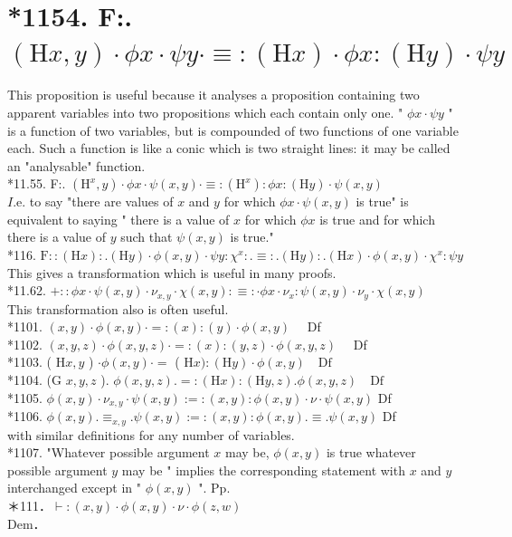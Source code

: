 \documentclass[10pt]{article}
\begin{document}
\section*{*1154. F:. $(\mathrm{H} x, y) \cdot \phi x \cdot \psi y \cdot \equiv:(\mathrm{H} x) \cdot \phi x:(\mathrm{H} y) \cdot \psi y$}
This proposition is useful because it analyses a proposition containing two apparent variables into two propositions which each contain only one. " $\phi x \cdot \psi y$ " is a function of two variables, but is compounded of two functions of one variable each. Such a function is like a conic which is two straight lines: it may be called an "analysable" function.\\
*11.55. F:. $\left(\mathrm{H}^{x}, y\right) \cdot \phi x \cdot \psi(x, y) \cdot \equiv:\left(\mathrm{H}^{x}\right): \phi x:(\mathrm{H} y) \cdot \psi(x, y)$\\
$I$.e. to say "there are values of $x$ and $y$ for which $\phi x \cdot \psi(x, y)$ is true" is equivalent to saying " there is a value of $x$ for which $\phi x$ is true and for which there is a value of $y$ such that $\psi(x, y)$ is true."\\
*116. $\mathrm{F}::(\mathrm{H} x): .(\mathrm{H} y) \cdot \phi(x, y) \cdot \psi y: \chi^{x}: . \equiv: .(\mathrm{H} y): .(\mathrm{H} x) \cdot \phi(x, y) \cdot \chi^{x}: \psi y$\\
This gives a transformation which is useful in many proofs.\\
*11.62. $+:: \phi x \cdot \psi(x, y) \cdot \nu_{x, y} \cdot \chi(x, y): \equiv: \cdot \phi x \cdot \nu_{x}: \psi(x, y) \cdot \nu_{y} \cdot \chi(x, y)$\\
This transformation also is often useful.\\
*1101. $(x, y) \cdot \phi(x, y) \cdot=:(x):(y) \cdot \phi(x, y) \quad$ Df\\
*1102. $(x, y, z) \cdot \phi(x, y, z) \cdot=:(x):(y, z) \cdot \phi(x, y, z) \quad$ Df\\
*1103. ( $\mathrm{H} x, y$ ) $\cdot \phi(x, y) \cdot=$ ( $\mathrm{H} x):(\mathrm{H} y) \cdot \phi(x, y) \quad \mathrm{Df}$\\
*1104. (G $x, y, z$ ). $\phi(x, y, z) .=:(\mathrm{H} x):(\mathrm{H} y, z) . \phi(x, y, z) \quad \mathrm{Df}$\\
*1105. $\phi(x, y) \cdot \nu_{x, y} \cdot \psi(x, y):=:(x, y): \phi(x, y) \cdot \nu \cdot \psi(x, y)$ Df\\
*1106. $\phi(x, y) . \equiv_{x, y} . \psi(x, y):=:(x, y): \phi(x, y) . \equiv . \psi(x, y)$ Df\\
with similar definitions for any number of variables.\\
*1107. "Whatever possible argument $x$ may be, $\phi(x, y)$ is true whatever possible argument $y$ may be " implies the corresponding statement with $x$ and $y$ interchanged except in " $\phi(x, y)$ ". Pp.\\
＊111．$\vdash:(x, y) \cdot \phi(x, y) \cdot \nu \cdot \phi(z, w)$\\
Dem．
\end{document}
